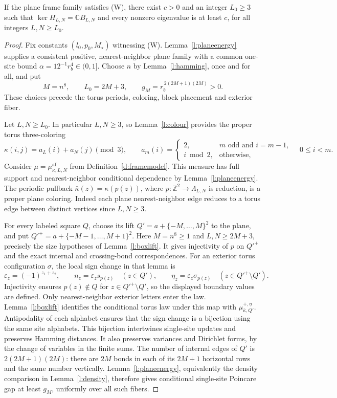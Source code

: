 \begin{theorem}\label{t:mainW}
If the plane frame family satisfies (W), there exist \(c>0\) and
an integer \(L_0\ge3\) such that
\(\ker H_{L,N}=\mathbb C B_{L,N}\) and every nonzero eigenvalue is
at least \(c\), for all integers \(L,N\ge L_0\).
\end{theorem}

\begin{proof}
Fix constants \((l_0,p_0,M_\star)\) witnessing (W).
Lemma~\ref{l:planeenergy} supplies a consistent positive,
nearest-neighbor plane family with a common one-site bound
\(\alpha=12^{-1}r_b^4\in(0,1]\).  Choose \(n\) by
Lemma~\ref{l:hamming}, once and for all, and put
\[
 M=n^8,\qquad L_0=2M+3,\qquad
 g_M=r_b^{\,2(2M+1)(2M)}>0.
\]
These choices precede the torus periods, coloring, block placement
and exterior fiber.

Let \(L,N\ge L_0\).  In particular \(L,N\ge3\), so
Lemma~\ref{l:colour} provides the proper torus three-coloring
\[
 \kappa(i,j)=a_L(i)+a_N(j)\pmod3,\qquad
 a_m(i)=\begin{cases}
 2,&m\text{ odd and }i=m-1,\\
 i\bmod2,&\text{otherwise},
 \end{cases}
 \quad 0\le i<m.
\]
Consider
\(\mu=\mu^{\mathrm{af}}_{\kappa,L,N}\) from
Definition~\ref{d:framemodel}.  This measure has full support and
nearest-neighbor conditional dependence by
Lemma~\ref{l:planeenergy}.  The periodic pullback
\(\bar\kappa(z)=\kappa(p(z))\), where
\(p:\mathbb Z^2\to\Lambda_{L,N}\) is reduction, is a proper plane
coloring.  Indeed each plane nearest-neighbor edge reduces to a
torus edge between distinct vertices since \(L,N\ge3\).

For every labeled square \(Q\), choose its lift
\(Q'=a+\{-M,\ldots,M\}^2\) to the plane, and put
\(Q'^+=a+\{-M-1,\ldots,M+1\}^2\).
Here \(M=n^8\ge1\) and \(L,N\ge2M+3\), precisely the size
hypotheses of Lemma~\ref{l:boxlift}.  It gives injectivity of
\(p\) on \(Q'^+\) and the exact internal and crossing-bond
correspondences.  For an exterior torus configuration \(\sigma\),
the local sign change in that lemma is
\[
 \varepsilon_z=(-1)^{z_1+z_2},\qquad
 n_z=\varepsilon_zs_{p(z)}\quad(z\in Q'),\qquad
 \eta_z=\varepsilon_z\sigma_{p(z)}
                                  \quad(z\in Q'^+\setminus Q').
\]
Injectivity ensures \(p(z)\notin Q\) for
\(z\in Q'^+\setminus Q'\), so the displayed boundary values
are defined.  Only nearest-neighbor exterior letters enter the law.
Lemma~\ref{l:boxlift} identifies the conditional torus law under
this map with \(\mu^{+,\eta}_{\bar\kappa,Q'}\).
Antipodality of each alphabet
ensures that the sign change is a bijection using the same site
alphabets.  This bijection intertwines single-site updates and
preserves Hamming distances.  It also preserves variances and
Dirichlet forms, by the change of variables in the finite sums.
The number of internal edges of \(Q'\) is
\(2(2M+1)(2M)\): there are \(2M\) bonds in each of its
\(2M+1\) horizontal rows and the same number vertically.
Lemma~\ref{l:planeenergy}, equivalently the density comparison in
Lemma~\ref{l:density}, therefore gives conditional single-site
Poincare gap at least \(g_M\), uniformly over all such fibers.


\end{proof}
